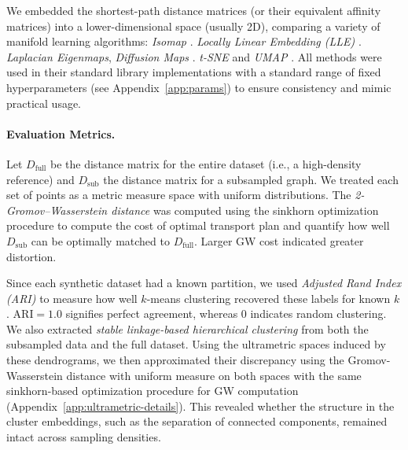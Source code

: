 \documentclass{article}
\theoremstyle{plain}
\theoremstyle{definition}
\theoremstyle{remark}
\begin{document}
We embedded the shortest-path distance matrices (or their equivalent affinity matrices) into a lower-dimensional space (usually 2D), comparing a variety of manifold learning algorithms: \emph{Isomap} \citet{tenenbaumGlobalGeometricFramework2000, trossetRehabilitatingIsomapEuclidean2021}.  
\emph{Locally Linear Embedding (LLE)} \citet{roweisNonlinearDimensionalityReduction2000}.  
\emph{Laplacian Eigenmaps}, \emph{Diffusion Maps} \citet{belkinLaplacianEigenmapsDimensionality2003, coifmanDiffusionMaps2006}. 
\emph{t-SNE} and \emph{UMAP} \citet{maaten2008tsne, mcinnesUMAPUniformManifold2020}. All methods were used in their standard library implementations with a standard range of fixed hyperparameters (see Appendix~\ref{app:params}) to ensure consistency and mimic practical usage.

\paragraph{Evaluation Metrics.}
\label{sec:methodology-metrics} 
Let $D_{\text{full}}$ be the distance matrix for the entire dataset (i.e., a high-density reference) and $D_{\text{sub}}$ the distance matrix for a subsampled graph. We treated each set of points as a metric measure space with uniform distributions. The \emph{2-Gromov--Wasserstein distance} was computed using the sinkhorn optimization procedure to compute the cost of optimal transport plan and quantify how well $D_{\text{sub}}$ can be optimally matched to $D_{\text{full}}$. Larger GW cost indicated greater distortion.

Since each synthetic dataset had a known partition, we used \emph{Adjusted Rand Index (ARI)} to measure how well $k$-means clustering recovered these labels for known $k$. $\mathrm{ARI}=1.0$ signifies perfect agreement, whereas $0$ indicates random clustering. We also extracted \emph{stable linkage-based hierarchical clustering} from both the subsampled data and the full dataset. Using the ultrametric spaces induced by these dendrograms, we then approximated their discrepancy using the Gromov-Wasserstein distance with uniform measure on both spaces with the same sinkhorn-based optimization procedure for GW computation (Appendix~\ref{app:ultrametric-details}). This revealed whether the structure in the cluster embeddings, such as the separation of connected components, remained intact across sampling densities.
\end{document}
